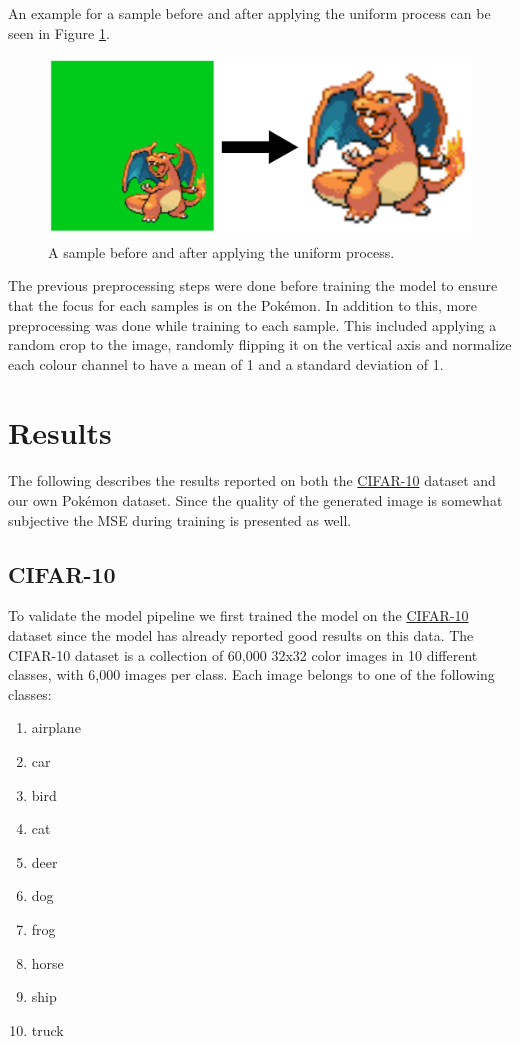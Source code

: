 \documentclass[12pt]{article}
\theoremstyle{plain}
\theoremstyle{definition}
\theoremstyle{remark}
\begin{document}
An example for a sample before and after applying the uniform process can be seen in Figure \ref{fig:preprocessingpipeline}.

\begin{figure}[h]
	\centering
	\includegraphics[width=0.5\linewidth]{src/Images/preprocessing_pipeline}
	\caption[Before and After Uniform Process]{A sample before and after applying the uniform process.}
	\label{fig:preprocessingpipeline}
\end{figure}

The previous preprocessing steps were done before training the model to ensure that the focus for each samples is on the Pokémon. In addition to this, more preprocessing was done while training to each sample. This included applying a random crop to the image, randomly flipping it on the vertical axis and normalize each colour channel to have a mean of 1 and a standard deviation of 1.

\newpage

\section{Results}\label{sec:results}
The following describes the results reported on both the \href{https://www.cs.toronto.edu/~kriz/cifar.html}{\ac{CIFAR-10}} dataset and our own Pokémon dataset. Since the quality of the generated image is somewhat subjective the \ac{MSE} during training is presented as well. 


\subsection{\ac{CIFAR-10}}\label{sec:results:cifar10}
To validate the model pipeline we first trained the model on the \href{https://www.cs.toronto.edu/~kriz/cifar.html}{\ac{CIFAR-10}} dataset since the model has already reported good results on this data. The \ac{CIFAR-10} dataset is a collection of 60,000 32x32 color images in 10 different classes, with 6,000 images per class. Each image belongs to one of the following classes:

\begin{multicols}{5}
	\begin{enumerate}[itemsep=2pt,parsep=2pt]
		\item airplane
		\item car
		\item bird
		\item cat
		\item deer
		\item dog
		\item frog 
		\item horse
		\item ship
		\item truck
	\end{enumerate}
\end{multicols}
\end{document}
